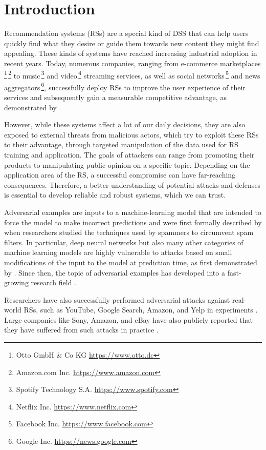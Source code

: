 \chapter{Introduction}
Recommendation systems (\acsp{RS}) are a special kind of \ac{DSS} that can help users quickly find what they desire or guide them towards new content they might find appealing. These kinds of systems have reached increasing industrial adoption in recent years. Today, numerous companies, ranging from e-commerce marketplaces\,\footnote{Otto GmbH \& Co KG \url{https://www.otto.de}}\,\footnote{Amazon.com Inc. \url{https://www.amazon.com}} to music\,\footnote{Spotify Technology S.A. \url{https://www.spotify.com}} and video\,\footnote{Netflix Inc. \url{https://www.netflix.com}} streaming services, as well as social networks\,\footnote{Facebook Inc. \url{https://www.facebook.com}} and news aggregators\,\footnote{Google Inc.  \url{https://news.google.com}}, successfully deploy \acp{RS} to improve the user experience of their services and subsequently gain a measurable competitive advantage, as demonstrated by \textcite{chen2004impact}.  

However, while these systems affect a lot of our daily decisions, they are also exposed to external threats from malicious actors, which try to exploit these \acp{RS} to their advantage, through targeted manipulation of the data used for \ac{RS} training and application. The goals of attackers can range from promoting their products to manipulating public opinion on a specific topic. Depending on the application area of the \ac{RS}, a successful compromise can have far-reaching consequences. Therefore, a better understanding of potential attacks and defenses is essential to develop reliable and robust systems, which we can trust.

Adversarial examples are inputs to a machine-learning model that are intended to force the model to make incorrect predictions and were first formally described by \textcite{dalvi2004adversarial} when researchers studied the techniques used by spammers to circumvent spam filters. In particular, deep neural networks but also many other categories of machine learning models are highly vulnerable to attacks based on small modifications of the input to the model at prediction time, as first demonstrated by \textcite{szegedy2013intriguing}. Since then, the topic of adversarial examples has developed into a fast-growing research field \parencite{carlini2019adversarial}.

Researchers have also successfully performed adversarial attacks against real-world \acp{RS}, such as YouTube, Google Search, Amazon, and Yelp in experiments \parencite{xing2013take, yang2017fake}. Large companies like Sony, Amazon, and eBay have also publicly reported that they have suffered from such attacks in practice \parencite{lam2004shilling}.

